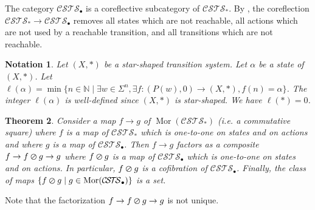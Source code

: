 \documentclass[a4paper,12pt]{amsart}
\newtheorem{thm}{Theorem}[section]
\newtheorem{nota}[thm]{Notation}
\begin{document}
The category ${\mathcal{C\!S\!T\!S}}_{\bullet}$ is a coreflective subcategory of
${\mathcal{C\!S\!T\!S}}_*$. By \cite[Proposition~5.5]{biscsts1}, the coreflection
${\mathcal{C\!S\!T\!S}}_* \to {\mathcal{C\!S\!T\!S}}_{\bullet}$ removes all states which are not
reachable, all actions which are not used by a reachable transition,
and all transitions which are not reachable.

\begin{nota} Let $(X,*)$ be a star-shaped transition system. Let
  $\alpha$ be a state of $(X,*)$. Let $\ell(\alpha) = \min \{n \in
  \mathbb{N} \mid \exists w\in \Sigma^n, \exists f:(P(w),0) \to (X,*),
  f(n)=\alpha\}$. The integer $\ell(\alpha)$ is well-defined since
  $(X,*)$ is star-shaped. We have $\ell(*)=0$.
\end{nota}

\begin{thm} \label{oslash} Consider a map $f\to g$ of $\operatorname{Mor}({\mathcal{C\!S\!T\!S}}_*)$ (i.e. a
commutative square) where $f$ is a map of ${\mathcal{C\!S\!T\!S}}_*$ which is
one-to-one on states and on actions and where $g$ is a map of
${\mathcal{C\!S\!T\!S}}_\bullet$. Then $f\to g$ factors as a composite $f\to
f\varoslash g \to g$ where $f\varoslash g$ is a map of ${\mathcal{C\!S\!T\!S}}_\bullet$
which is one-to-one on states and on actions. In particular,
$f\varoslash g$ is a cofibration of ${\mathcal{C\!S\!T\!S}}_\bullet$.  Finally, the
class of maps $\{f \varoslash g \mid g\in \operatorname{Mor}({\mathcal{C\!S\!T\!S}}_\bullet)\}$ is a
set. \end{thm}

Note that the factorization $f\to f\varoslash g \to g$ is not unique.
\end{document}
